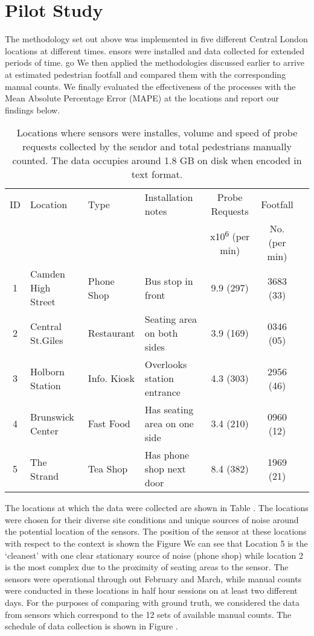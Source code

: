 \section{Pilot Study}

The methodology set out above was implemented in five different Central London locations at different times.
ensors were installed and data collected for extended periods of time.
go
We then applied the methodologies discussed earlier to arrive at estimated pedestrian footfall and compared them with the corresponding manual counts.
We finally evaluated the effectiveness of the processes with the Mean Absolute Percentage Error (MAPE) at the locations and report our findings below.

\begin{table}
    \caption{Locations where sensors were installes, volume and speed of probe
    requests collected by the sendor and total pedestrians manually counted. The data occupies around 1.8 GB on disk when encoded in text format.}
    {\begin{tabular}{clllccc} 
     ID & Location & Type & Installation notes & Probe Requests & Footfall\\
     & & & & x10\textsuperscript{6} (per min) & No. (per min)\\
     1 & Camden High Street & Phone Shop & Bus stop in front & 9.9 (297) & 3683 (33)\\
     2 & Central St.Giles & Restaurant & Seating area on both sides & 3.9 (169) & 0346 (05)\\
     3 & Holborn Station & Info. Kiosk & Overlooks station entrance & 4.3 (303) & 2956 (46)\\
     4 & Brunswick Center & Fast Food & Has seating area on one side & 3.4 (210) & 0960 (12)\\
     5 & The Strand & Tea Shop & Has phone shop next door & 8.4 (382) & 1969 (21)\\
    \end{tabular}}
    \label{locations-table}
\end{table}

The locations at which the data were collected are shown in Table .
The locations were chosen for their diverse site conditions and unique sources of noise around the potential location of the sensors.
The position of the sensor at these locations with respect to the context is shown the Figure 
We can see that Location 5 is the `cleanest' with one clear stationary source of noise (phone shop) while location 2 is the most complex due to the proximity of seating areas to the sensor.
The sensors were operational through out February and March, while manual counts were conducted in these locations in half hour sessions on at least two different days.
For the purposes of comparing with ground truth, we considered the data from sensors which correspond to the 12 sets of available manual counts.
The schedule of data collection is shown in Figure .


